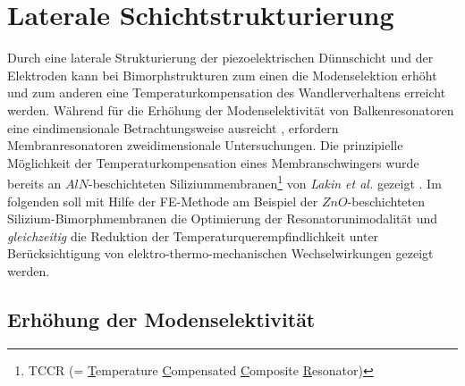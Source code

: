 \section{Laterale Schichtstrukturierung}
\label{schichtstrukturierung}

Durch eine laterale Strukturierung der piezoelektrischen Dünnschicht
und der Elektroden kann bei Bimorphstrukturen zum einen die Modenselektion
erhöht und zum anderen eine Temperaturkompensation des Wandlerverhaltens
erreicht werden. Während für die Erhöhung der Modenselektivität von
Balkenresonatoren
eine eindimensionale Betrachtungsweise ausreicht \cite{Pra93}, erfordern
Membranresonatoren zweidimensionale Untersuchungen.
Die prinzipielle Möglichkeit der Temperaturkompensation eines
Membranschwingers wurde bereits an $AlN$-beschichteten
Siliziummembranen\footnote{TCCR (= \underline{T}emperature
\underline{C}ompensated \underline{C}omposite \underline{R}esonator)}
von {\sl Lakin et al.} gezeigt \cite{Lak82}.
Im folgenden soll mit Hilfe der FE-Methode am Beispiel
der $ZnO$-beschichteten Silizium-Bimorphmembranen die Optimierung der
Resonatorunimodalität und {\em gleichzeitig} die Reduktion der
Temperaturquerempfindlichkeit unter Berücksichtigung von
elektro-thermo-mechanischen Wechselwirkungen gezeigt werden.


\subsection{Erhöhung der Modenselektivität}
\label{modenselektivitaet}

